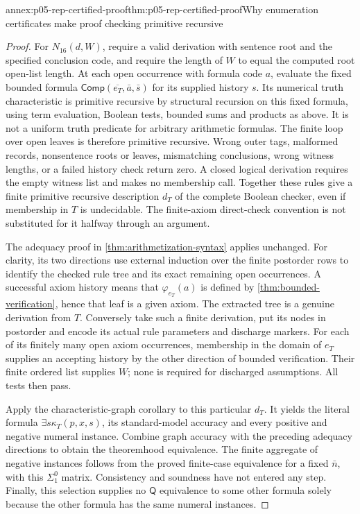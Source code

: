 \begin{annexitem}{annex:p05-rep-certified-proof}{thm:p05-rep-certified-proof}{Why enumeration certificates make proof checking primitive recursive}
\begin{proof}
For \(N_{16}(d,W)\), require a valid derivation with sentence root and
the specified conclusion code, and require the length of \(W\) to equal
the computed root open-list length. At each open occurrence with formula
code \(a\), evaluate the fixed bounded formula
\(\mathsf{Comp}(\overline{e_T},\bar a,\bar s)\) for its supplied
history \(s\). Its numerical truth characteristic is primitive recursive
by structural recursion on this fixed formula, using term evaluation,
Boolean tests, bounded sums and products as above. It is not a uniform
truth predicate for arbitrary arithmetic formulas. The finite loop over
open leaves is therefore primitive recursive. Wrong outer tags,
malformed records, nonsentence roots or leaves, mismatching conclusions,
wrong witness lengths, or a failed history check return zero. A closed
logical derivation requires the empty witness list and makes no membership
call. Together these rules give a finite primitive recursive description
\(d_T\) of the complete Boolean checker, even if membership in \(T\)
is undecidable. The finite-axiom direct-check convention is not substituted
for it halfway through an argument.

The adequacy proof in \cref{thm:arithmetization-syntax} applies unchanged.
For clarity, its two directions use external induction over the finite
postorder rows to identify the checked rule tree and its exact remaining
open occurrences. A successful axiom history means that
\(\varphi_{e_T}(a)\) is defined by \cref{thm:bounded-verification}, hence
that leaf is a given axiom. The extracted tree is a genuine derivation
from \(T\). Conversely take such a finite derivation, put its nodes in
postorder and encode its actual rule parameters and discharge markers.
For each of its finitely many open axiom occurrences, membership in the
domain of \(e_T\) supplies an accepting history by the other direction
of bounded verification. Their finite ordered list supplies \(W\);
none is required for discharged assumptions. All tests then pass.

Apply the characteristic-graph corollary to this particular \(d_T\).
It yields the literal formula \(\exists s\kappa_T(p,x,s)\), its
standard-model accuracy and every positive and negative numeral
instance. Combine graph accuracy with the preceding adequacy directions
to obtain the theoremhood equivalence. The finite aggregate of negative
instances follows from the proved finite-case equivalence for a fixed
\(\bar n\), with this \(\Sigma^0_1\) matrix. Consistency and soundness
have not entered any step. Finally, this selection supplies no
\(\mathsf Q\) equivalence to some other formula solely because the
other formula has the same numeral instances.
\end{proof}
\end{annexitem}


